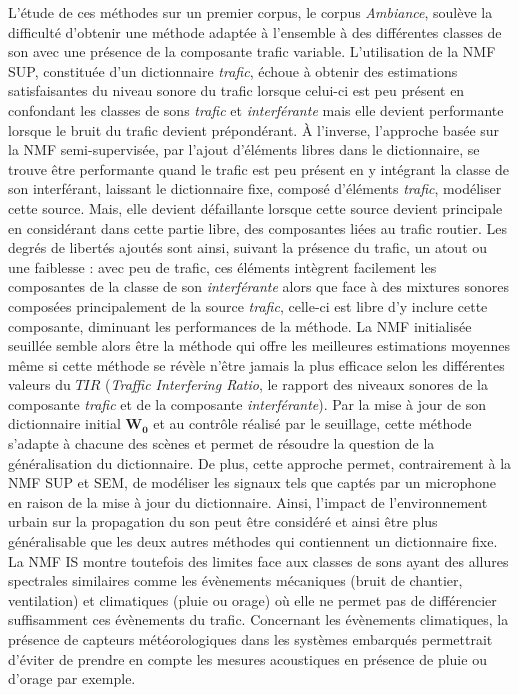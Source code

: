 L'étude de ces méthodes sur un premier corpus, le corpus \textit{Ambiance}, soulève la difficulté d'obtenir une méthode adaptée à l'ensemble à des différentes classes de son avec une présence de la composante trafic variable. 
L'utilisation de la NMF SUP, constituée d'un dictionnaire \textit{trafic}, échoue à obtenir des estimations satisfaisantes du niveau sonore du trafic lorsque celui-ci est peu présent en confondant les classes de sons \textit{trafic} et \textit{interférante} mais elle devient performante lorsque le bruit du trafic devient prépondérant. 
À l'inverse, l'approche basée sur la NMF semi-supervisée, par l'ajout d'éléments libres dans le dictionnaire, se trouve être performante quand le trafic est peu présent en y intégrant la classe de son interférant, laissant le dictionnaire fixe, composé d'éléments \textit{trafic}, modéliser cette source. 
Mais, elle devient défaillante lorsque cette source devient principale en considérant dans cette partie libre, des composantes liées au trafic routier. Les degrés de libertés ajoutés sont ainsi, suivant la présence du trafic, un atout ou une faiblesse : avec peu de trafic, ces éléments intègrent facilement les composantes de la classe de son \textit{interférante} alors que face à des mixtures sonores composées principalement de la source \textit{trafic}, celle-ci est libre d'y inclure cette composante, diminuant les performances de la méthode.
La NMF initialisée seuillée semble alors être la méthode qui offre les meilleures estimations moyennes même si cette méthode se révèle n'être jamais la plus efficace selon les différentes valeurs du $TIR$ (\textit{Traffic Interfering Ratio}, le rapport des niveaux sonores de la composante \textit{trafic} et de la composante \textit{interférante}). Par la mise à jour de son dictionnaire initial $\mathbf{W_0}$ et au contrôle réalisé par le seuillage, cette méthode s'adapte à chacune des scènes et permet de résoudre la question de la généralisation du dictionnaire. De plus, cette approche permet, contrairement à la NMF SUP et SEM, de modéliser les signaux tels que captés par un microphone en raison de la mise à jour du dictionnaire. Ainsi, l'impact de l'environnement urbain sur la propagation du son peut être considéré et ainsi être plus généralisable que les deux autres méthodes qui contiennent un dictionnaire fixe. La NMF IS montre toutefois des limites face aux classes de sons ayant des allures spectrales similaires comme les évènements mécaniques (bruit de chantier, ventilation) et climatiques (pluie ou orage) où elle ne permet pas de différencier suffisamment ces évènements du trafic. Concernant les évènements climatiques, la présence de capteurs météorologiques dans les systèmes embarqués permettrait d'éviter de prendre en compte les mesures acoustiques en présence de pluie ou d'orage par exemple.

